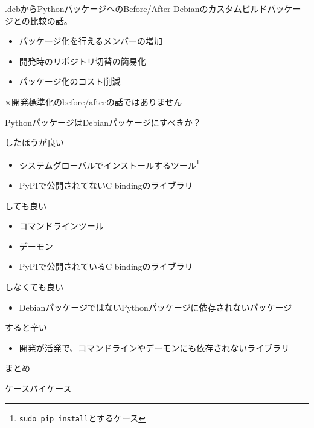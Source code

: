 \begin{frame}{.debからPythonパッケージへのBefore/After}
  Debianのカスタムビルドパッケージとの比較の話。
  \begin{itemize}
  \item パッケージ化を行えるメンバーの増加
  \item 開発時のリポジトリ切替の簡易化
  \item パッケージ化のコスト削減
  \end{itemize}
  ※開発標準化のbefore/afterの話ではありません
\end{frame}

\begin{frame}

  {\Huge PythonパッケージはDebianパッケージにすべきか？}
  
\end{frame}

\begin{frame}{したほうが良い}
  \begin{itemize}
  \item システムグローバルでインストールするツール\footnote{\texttt{sudo pip install}とするケース}
  \item PyPIで公開されてないC bindingのライブラリ
  \end{itemize}
\end{frame}

\begin{frame}{しても良い}
  \begin{itemize}
  \item コマンドラインツール
  \item デーモン
   \item PyPIで公開されているC bindingのライブラリ
  \end{itemize}
\end{frame}

\begin{frame}{しなくても良い}
  \begin{itemize}
  \item DebianパッケージではないPythonパッケージに依存されないパッケージ
  \end{itemize}
\end{frame}

\begin{frame}{すると辛い}
  \begin{itemize}
    \item 開発が活発で、コマンドラインやデーモンにも依存されないライブラリ
  \end{itemize}
\end{frame}
  
\begin{frame}{まとめ}

  {\Huge ケースバイケース}
  
\end{frame}


